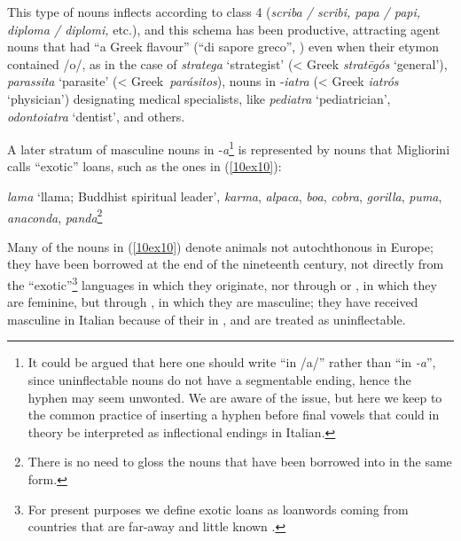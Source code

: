 \documentclass[output=paper,colorlinks,citecolor=brown]{langscibook}
\begin{document}
This type of nouns inflects according to class 4 (\emph{scriba / scribi, papa / papi, diploma / diplomi,} etc.), and this schema has been productive, attracting agent nouns that had ``a Greek flavour'' (``di sapore greco'', \citealt[59]{migliorini1957}) even when their etymon contained /o/, as in the case of \emph{stratega} `strategist' (\textless{} Greek \emph{stratēgós} `general'), \emph{parassita} `parasite' (\textless{} Greek~\emph{parásitos}), nouns in ‑\emph{iatra} (\textless{} Greek \emph{iatrós} `physician') designating medical specialists, like \emph{pediatra} `pediatrician', \emph{odontoiatra} `dentist', and others.

A later stratum of masculine nouns in ‑\emph{a}\footnote{It could be argued that here one should write ``in /a/'' rather than ``in \emph{-a}'', since uninflectable nouns do not have a segmentable ending, hence the hyphen may seem unwonted. We are aware of the issue, but here we keep to the common practice of inserting a hyphen before final vowels that could in theory be interpreted as inflectional endings in Italian.} is represented by nouns that Migliorini calls ``exotic'' loans, such as the ones in (\ref{10ex10}):

\begin{exe}
	\ex \label{10ex10}
		\emph{lama} ‘llama; Buddhist spiritual leader’, \emph{karma}, \emph{alpaca}, \emph{boa}, \emph{cobra}, \emph{gorilla}, \emph{puma}, \emph{anaconda}, \emph{panda}\footnote{There is no need to gloss the nouns that have been borrowed into  in the same form.}
\end{exe}

Many of the nouns in (\ref{10ex10}) denote animals not autochthonous in Europe; they have been borrowed at the end of the nineteenth century, not directly from the ``exotic''\footnote{For present purposes we define exotic loans as loanwords coming from countries that are far-away and little known \citep[7]{mancini1992}.} languages in which they originate, nor through  or , in which they are feminine, but through , in which they are masculine; they have received masculine  in Italian because of their  in , and are treated as uninflectable.
\end{document}
